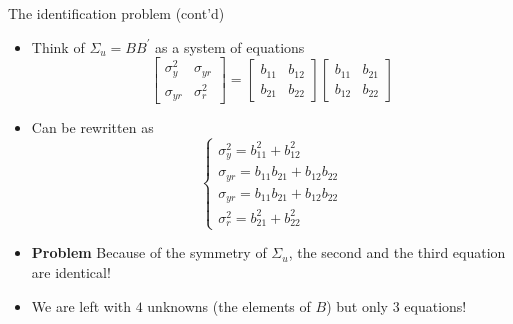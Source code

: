 \documentclass[10pt,handout]{beamer}
\begin{document}
\begin{frame}
{The identification problem (cont'd)}
\begin{itemize}
\item Think of $\Sigma_{u}=BB^{\prime}$ as a system of equations 
\begin{equation*}
\left[ 
\begin{array}{cc}
\sigma_{y}^{2} & \sigma_{yr} \\ 
\sigma_{yr}  & \sigma_{r}^{2}%
\end{array}%
\right] =\left[ 
\begin{array}{cc}
b_{11} & b_{12} \\ 
b_{21} & b_{22}%
\end{array}%
\right] \left[ 
\begin{array}{cc}
b_{11} & b_{21} \\ 
b_{12} & b_{22}%
\end{array}%
\right]
\end{equation*}

\item Can be rewritten as%
\begin{equation*}
\left\{ 
\begin{array}{l}
\sigma_{y}^{2}=b_{11}^{2}+b_{12}^{2} \\ 
\sigma_{yr}=b_{11}b_{21}+b_{12}b_{22} \\ 
\sigma_{yr}=b_{11}b_{21}+b_{12}b_{22} \\ 
\sigma_{r}^{2}=b_{21}^{2}+b_{22}^{2}%
\end{array}%
\right.
\end{equation*}
\pause
\item \textbf{Problem} Because of the symmetry of $\Sigma_{u}$, the second and the third equation are identical!
\bigskip
\item We are left with $4$ unknowns (the elements of $B$) but only $3$ equations!
\end{itemize}
\end{frame}
\shownotesblock{}
\end{document}
